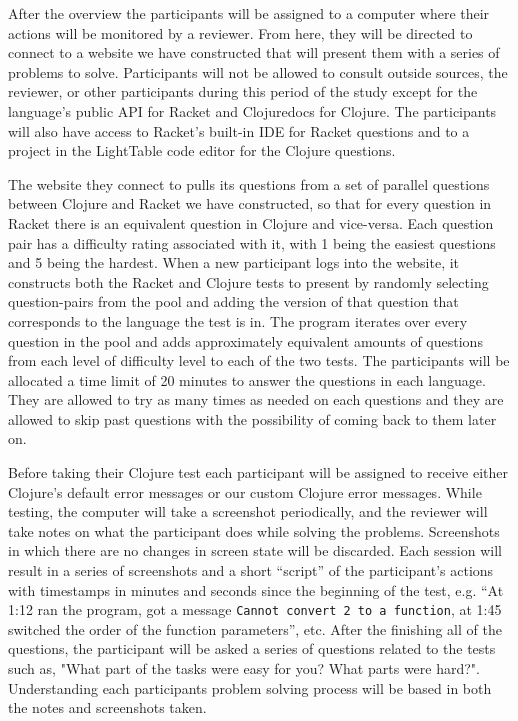 \documentclass[submission,copyright,creativecommons]{eptcs}
\begin{document}
After the overview the participants will be assigned to a computer where their actions will be monitored by a reviewer. 
From here, they will be directed to connect to a website we have constructed that will present them with a series of problems to solve. 
Participants will not be allowed to consult outside sources, the reviewer, or other participants during this period of the study except for the language's public API for Racket and Clojuredocs for Clojure.
The participants will also have access to Racket's built-in IDE for Racket questions and to a project in the LightTable code editor for the Clojure questions. 

The website they connect to pulls its questions from a set of parallel questions between Clojure and Racket we have constructed, so that for every question in Racket there is an equivalent question in Clojure and vice-versa.
Each question pair has a difficulty rating associated with it, with 1 being the easiest questions and 5 being the hardest.
When a new participant logs into the website, it constructs both the Racket and Clojure tests to present by randomly selecting question-pairs from the pool and adding the version of that question that corresponds to the language the test is in. 
The program iterates over every question in the pool and adds approximately equivalent amounts of questions from each level of difficulty level to each of the two tests.
	The participants will be allocated a time limit of 20 minutes to answer the questions in each language. 
They are allowed to try as many times as needed on each questions and they are allowed to skip past questions with the possibility of coming back to them later on. 

Before taking their Clojure test each participant will  be assigned to receive either Clojure's default error messages or our custom Clojure error messages.
While testing, the computer will take a screenshot periodically, and the reviewer will take notes on what the participant does while solving the problems.
Screenshots in which there are no changes in screen state will be discarded. 
Each session will result in a series of screenshots and a short ``script'' of the participant's actions with timestamps in minutes and seconds since the beginning of the test, e.g. ``At 1:12 ran the program, got a message \texttt{Cannot convert 2 to a function}, at 1:45 switched the order of the function parameters'', etc.
After the finishing all of the questions, the participant will be asked a series of questions related to the tests such as, "What part of the tasks were easy for you? What parts were hard?".
Understanding each participants problem solving process will be based in both the notes and screenshots taken.
\end{document}
